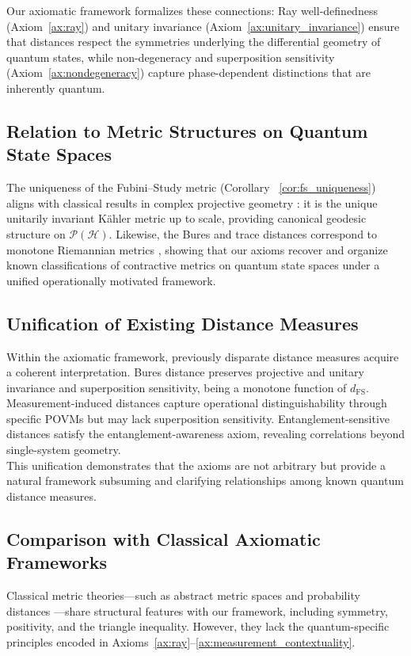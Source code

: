 \documentclass[aps,pra,reprint,nofootinbib,showpacs,superscriptaddress]{revtex4-1}
\newcommand{\Hilbert}{\mathcal{H}}
\newcommand{\Proj}{\mathcal{P}}
\begin{document}
Our axiomatic framework formalizes these connections: Ray well-definedness (Axiom~\ref{ax:ray}) and unitary invariance (Axiom~\ref{ax:unitary_invariance}) ensure that distances respect the symmetries underlying the differential geometry of quantum states, while non-degeneracy and superposition sensitivity (Axiom~\ref{ax:nondegeneracy}) capture phase-dependent distinctions that are inherently quantum.


\subsection{Relation to Metric Structures on Quantum State Spaces}
The uniqueness of the Fubini--Study metric (Corollary~
\ref{cor:fs_uniqueness}) aligns with classical results in complex projective geometry \cite{kobayashi1996foundations}: it is the unique unitarily invariant Kähler metric up to scale, providing canonical geodesic structure on $\Proj(\Hilbert)$. Likewise, the Bures and trace distances correspond to monotone Riemannian metrics \cite{petz1996monotone}, showing that our axioms recover and organize known classifications of contractive metrics on quantum state spaces under a unified operationally motivated framework.

\subsection{Unification of Existing Distance Measures}
Within the axiomatic framework, previously disparate distance measures acquire a coherent interpretation. 
Bures distance preserves projective and unitary invariance and superposition sensitivity, being a monotone function of $d_{\text{FS}}$. Measurement-induced distances capture operational distinguishability through specific POVMs but may lack superposition sensitivity. Entanglement-sensitive distances satisfy the entanglement-awareness axiom, revealing correlations beyond single-system geometry.\\
This unification demonstrates that the axioms are not arbitrary but provide a natural framework subsuming and clarifying relationships among known quantum distance measures.
\subsection{Comparison with Classical Axiomatic Frameworks}
Classical metric theories—such as abstract metric spaces \cite{hausdorff1918dimension} and probability distances \cite{cover2006elements}—share structural features with our framework, including symmetry, positivity, and the triangle inequality. However, they lack the quantum-specific principles encoded in Axioms~\ref{ax:ray}--\ref{ax:measurement_contextuality}.
\end{document}
